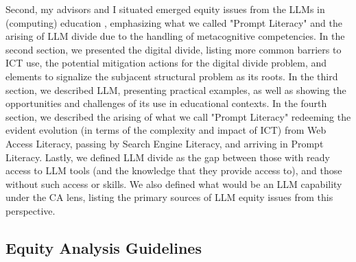 Second, my advisors and I situated emerged equity issues from the \glspl{LLM} in (computing) education \cite{bispojr:2024-nmp}, emphasizing what we called "Prompt Literacy" and the arising of \gls{LLM}
divide due to the handling of metacognitive competencies. In the second section, we presented the digital divide, listing more common barriers to \gls{ICT} use, the potential mitigation actions for the digital divide problem, and elements to signalize the subjacent structural problem as its roots. In the third section, we described \gls{LLM}, presenting practical examples, as well as showing the opportunities and challenges of its use in educational contexts. In the fourth section, we described the arising of what we call "Prompt Literacy" redeeming the evident evolution (in terms of the complexity and impact of \gls{ICT}) from Web Access Literacy, passing by Search Engine Literacy, 
and arriving in Prompt Literacy. Lastly, we defined \gls{LLM} divide as the gap between those with ready access to \gls{LLM} tools (and the knowledge that they provide access to), and those without such access or skills. We also defined what would be an \gls{LLM} capability under the \gls{CA} lens, listing the primary sources of \gls{LLM} equity issues from this perspective.

\subsection{Equity Analysis Guidelines}
\label{disc-ss:eq-guidelines}

